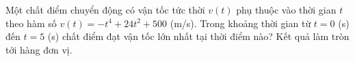 \begin{bt}%
	Một chất điểm chuyển động có vận tốc tức thời $v(t)$ phụ thuộc vào thời gian $t$ theo hàm số $v(t)=-t^{4}+24 t^{2}+500$ (m/s). Trong khoảng thời gian từ $t=0$  (s) đến $t=5$ (s) chất điểm đạt vận tốc lớn nhất tại thời điểm nào? Kết quả làm tròn tới hàng đơn vị.
\end{bt}

